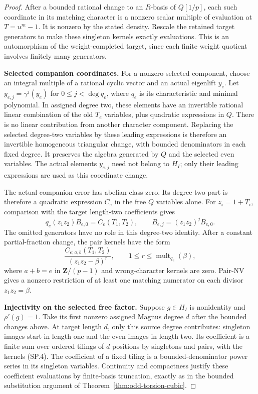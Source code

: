 \documentclass[11pt,a4paper]{article}
\theoremstyle{definition}
\begin{document}
\begin{proof}
After a bounded rational change to an $R$-basis of $Q[1/p]$,
each such coordinate in its matching character is a nonzero
scalar multiple of evaluation at $T=u^m-1$. It is nonzero by
the stated density. Rescale the retained target generators to
make these singleton kernels exactly evaluations. This is an
automorphism of the weight-completed target, since each finite
weight quotient involves finitely many generators.

\par\medskip\noindent\textbf{Selected companion coordinates.}
For a nonzero selected component, choose an integral multiple
of a rational cyclic vector and an actual eigenlift $y_e$.
Let $y_{e,j}=\gamma^j(y_e)$ for
$0\leq j<\deg q_e$, where $q_e$ is its characteristic and
minimal polynomial. In assigned degree two, these elements
have an invertible rational linear combination of the old
$T_e$ variables, plus quadratic expressions in $Q$.
There is no linear contribution from another character
component. Replacing the selected degree-two variables by
these leading expressions is therefore an invertible
homogeneous triangular change, with bounded denominators in
each fixed degree. It preserves the algebra generated by $Q$
and the selected even variables. The actual elements $y_{e,j}$
need not belong to $H_I$; only their leading expressions are
used as this coordinate change.

The actual companion error has abelian class zero. Its degree-two
part is therefore a quadratic expression $C_e$ in the free
$Q$ variables alone. For $z_i=1+T_i$, comparison with the
target length-two coefficients gives
\[
 q_e(z_1z_2)B_{e,0}=C_e(T_1,T_2),\qquad
 B_{e,j}=(z_1z_2)^jB_{e,0}.
\]
The omitted generators have no role in this degree-two
identity. After a constant partial-fraction change, the pair
kernels have the form
\[
              \frac{C_{e;a,b}(T_1,T_2)}{(z_1z_2-\beta)^r},
 \qquad 1\leq r\leq\operatorname{mult}_{q_e}(\beta),
 \tag{SP.4}
\]
where $a+b=e$ in $\mathbf Z/(p-1)$ and wrong-character kernels
are zero. Pair-NV gives a nonzero restriction of at least one
matching numerator on each divisor $z_1z_2=\beta$.

\par\medskip\noindent\textbf{Injectivity on the selected free factor.}
Suppose $g\in H_I$ is nonidentity and $\rho'(g)=1$.
Take its first nonzero assigned Magnus degree $d$ after the
bounded changes above. At target length $d$, only this source
degree contributes: singleton images start in length one and
the even images in length two. Its coefficient is a finite
sum over ordered tilings of $d$ positions by singletons and
pairs, with the kernels (SP.4). The coefficient of a fixed
tiling is a bounded-denominator power series in its singleton
variables. Continuity and compactness justify these coefficient
evaluations by finite-basis truncation, exactly as in the
bounded substitution argument of
Theorem~\ref{thm:odd-torsion-cubic}.


\end{proof}
\end{document}
